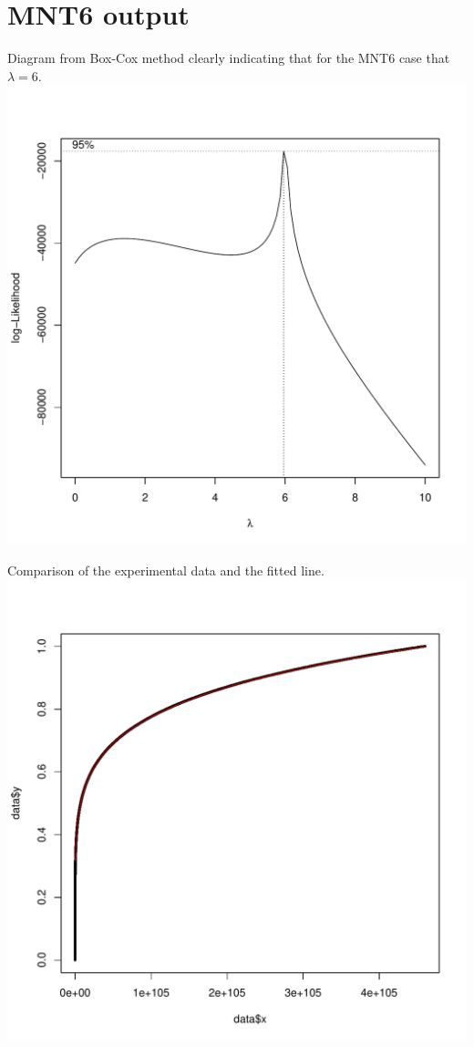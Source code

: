 \documentclass[a4paper, 10pt, envcountsect, runningheads]{article}
\numberwithin{figure}{section}
\numberwithin{equation}{section}
\begin{document}
\section{MNT6 output}\label{A:MNT6_output}
Diagram from Box-Cox method clearly indicating that for the MNT6 case that $\lambda=6$.\\
\includegraphics[scale=0.7]{graphs/CheckLineFit2}\label{fig:boxcox}

Comparison of the experimental data and the fitted line.\\
\includegraphics[scale=0.65]{graphs/CheckLineFit4}\label{fig:linefit}
\end{document}
